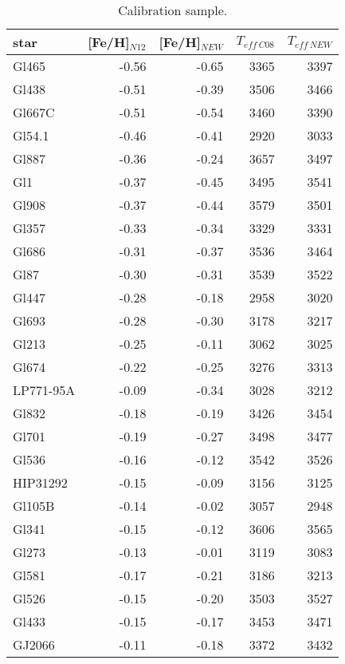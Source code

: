 \documentclass[structabstract]{aa}
\begin{document}
\begin{table}[]
\centering
\caption{Calibration sample.}
\label{caltable}
\begin{center}
\begin{tabular}{l r r r r }

\hline
\hline

star & [Fe/H]$_{N12}$ & [Fe/H]$_{NEW}$ & $T_{eff~C08}$ & $T_{eff~NEW}$ \\

\hline

Gl465 & -0.56 & -0.65 & 3365 & 3397 \\
Gl438 & -0.51 & -0.39 & 3506 & 3466 \\
Gl667C & -0.51 & -0.54 & 3460 & 3390 \\
Gl54.1 & -0.46 & -0.41 & 2920 & 3033 \\
Gl887 & -0.36 & -0.24 & 3657 & 3497 \\
Gl1 & -0.37 & -0.45 & 3495 & 3541 \\
Gl908 & -0.37 & -0.44 & 3579 & 3501 \\
Gl357 & -0.33 & -0.34 & 3329 & 3331 \\
Gl686 & -0.31 & -0.37 & 3536 & 3464 \\
Gl87 & -0.30 & -0.31 & 3539 & 3522 \\
Gl447 & -0.28 & -0.18 & 2958 & 3020 \\
Gl693 & -0.28 & -0.30 & 3178 & 3217 \\
Gl213 & -0.25 & -0.11 & 3062 & 3025 \\
Gl674 & -0.22 & -0.25 & 3276 & 3313 \\
LP771-95A & -0.09 & -0.34 & 3028 & 3212 \\
Gl832 & -0.18 & -0.19 & 3426 & 3454 \\
Gl701 & -0.19 & -0.27 & 3498 & 3477 \\
Gl536 & -0.16 & -0.12 & 3542 & 3526 \\
HIP31292 & -0.15 & -0.09 & 3156 & 3125 \\
Gl105B & -0.14 & -0.02 & 3057 & 2948 \\
Gl341 & -0.15 & -0.12 & 3606 & 3565 \\
Gl273 & -0.13 & -0.01 & 3119 & 3083 \\
Gl581 & -0.17 & -0.21 & 3186 & 3213 \\
Gl526 & -0.15 & -0.20 & 3503 & 3527 \\
Gl433 & -0.15 & -0.17 & 3453 & 3471 \\
GJ2066 & -0.11 & -0.18 & 3372 & 3432 \\

\end{tabular}
\end{center}
\end{table}
\end{document}
